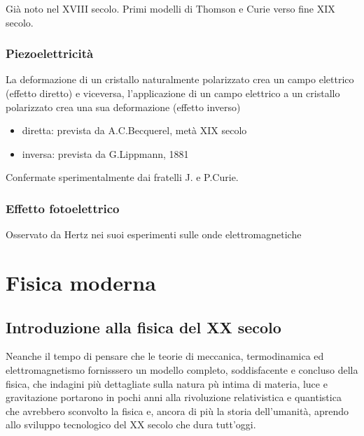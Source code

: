 \documentclass[letterpaper,10pt,italian]{jupyterBook}
\begin{document}
\sphinxAtStartPar
Già noto nel XVIII secolo. Primi modelli di Thomson e Curie verso fine XIX secolo.


\section{Piezoelettricità}
\label{\detokenize{ch/electromagnetism/thermoelectric-effects:piezoelettricita}}\label{\detokenize{ch/electromagnetism/thermoelectric-effects:physics-hs-modern-intro-experiences-piezoel}}
\sphinxAtStartPar
La deformazione di un cristallo naturalmente polarizzato crea un campo elettrico (effetto diretto) e viceversa, l’applicazione di un campo elettrico a un cristallo polarizzato crea una sua deformazione (effetto inverso)
\begin{itemize}
\item {} 
\sphinxAtStartPar
diretta: prevista da A.C.Becquerel, metà XIX secolo

\item {} 
\sphinxAtStartPar
inversa: prevista da G.Lippmann, 1881

\end{itemize}

\sphinxAtStartPar
Confermate sperimentalmente dai fratelli J. e P.Curie.


\section{Effetto fotoelettrico}
\label{\detokenize{ch/electromagnetism/thermoelectric-effects:effetto-fotoelettrico}}\label{\detokenize{ch/electromagnetism/thermoelectric-effects:physics-hs-modern-intro-experiences-photoel}}
\sphinxAtStartPar
Osservato da Hertz nei suoi esperimenti sulle onde elettromagnetiche

\sphinxAtStartPar
{} 

\sphinxstepscope


\part{Fisica moderna}

\sphinxstepscope


\chapter{Introduzione alla fisica del XX secolo}
\label{\detokenize{ch/modern/intro:introduzione-alla-fisica-del-xx-secolo}}\label{\detokenize{ch/modern/intro:physics-hs-modern-intro}}\label{\detokenize{ch/modern/intro::doc}}
\sphinxAtStartPar
Neanche il tempo di pensare che le teorie di meccanica, termodinamica ed elettromagnetismo fornisssero un modello completo, soddisfacente e concluso della fisica, che indagini più dettagliate sulla natura pù intima di materia, luce e gravitazione portarono in pochi anni alla rivoluzione relativistica e quantistica che avrebbero sconvolto la fisica e, ancora di più la storia dell’umanità, aprendo allo sviluppo tecnologico del XX secolo che dura tutt’oggi.
\end{document}
